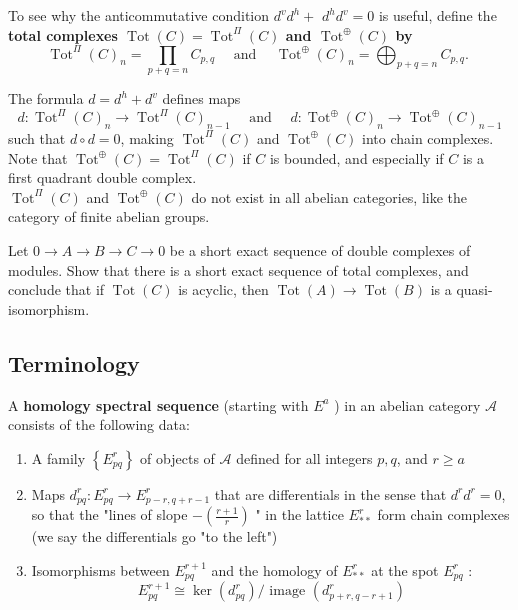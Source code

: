 To see why the anticommutative condition $d^v d^h+$ $d^h d^v=0$ is useful, define the \bf{total complexes} $\operatorname{Tot}(C)=\operatorname{Tot}^{\Pi}(C)$ and $\operatorname{Tot}^{\oplus}(C)$ by
$$
\operatorname{Tot}^{\Pi}(C)_n=\prod_{p+q=n} C_{p, q} \quad \text { and } \quad \operatorname{Tot}^{\oplus}(C)_n=\bigoplus_{p+q=n} C_{p, q} \text {. }
$$

The formula $d=d^h+d^v$ defines maps
$$
d: \operatorname{Tot}^{\Pi}(C)_n \rightarrow \operatorname{Tot}^{\Pi}(C)_{n-1} \quad \text { and } \quad d: \operatorname{Tot}^{\oplus}(C)_n \rightarrow \operatorname{Tot}^{\oplus}(C)_{n-1}
$$
such that $d \circ d=0$, making $\operatorname{Tot}^{\Pi}(C)$ and $\operatorname{Tot}^{\oplus}(C)$ into chain complexes. Note that $\operatorname{Tot}^{\oplus}(C)=\operatorname{Tot}^{\Pi}(C)$ if $C$ is bounded, and especially if $C$ is a first quadrant double complex.\\ $\operatorname{Tot}^{\Pi}(C)$ and $\operatorname{Tot}^{\oplus}(C)$ do not exist in all abelian categories, like the category of finite abelian groups.

\begin{prop}
Let $0 \rightarrow A \rightarrow B \rightarrow C \rightarrow 0$ be a short exact sequence of double complexes of modules. Show that there is a short exact sequence of total complexes, and conclude that if $\operatorname{Tot}(C)$ is acyclic, then $\operatorname{Tot}(A) \rightarrow \operatorname{Tot}(B)$ is a quasi-isomorphism.
\end{prop}

\subsection{Terminology}

A \textbf{homology spectral sequence } (starting with $E^a$ ) in an abelian category $\mathcal{A}$ consists of the following data:
\begin{enumerate}
    \item 
    A family $\left\{E_{p q}^r\right\}$ of objects of $\mathcal{A}$ defined for all integers $p, q$, and $r \geq a$
    \item 
    Maps $d_{p q}^r: E_{p q}^r \rightarrow E_{p-r, q+r-1}^r$ that are differentials in the sense that $d^r d^r=0$, so that the "lines of slope $ \displaystyle - \left(\frac{r+1}{r}\right)$ " in the lattice $E_{* *}^r$ form chain complexes (we say the differentials go "to the left")
    \item 
    Isomorphisms between $E_{p q}^{r+1}$ and the homology of $E_{* *}^r$ at the spot $E_{p q}^r$ :
    $$
    E_{p q}^{r+1} \cong \operatorname{ker}\left(d_{p q}^r\right) / \text { image }\left(d_{p+r, q-r+1}^r\right)
    $$
\end{enumerate}

